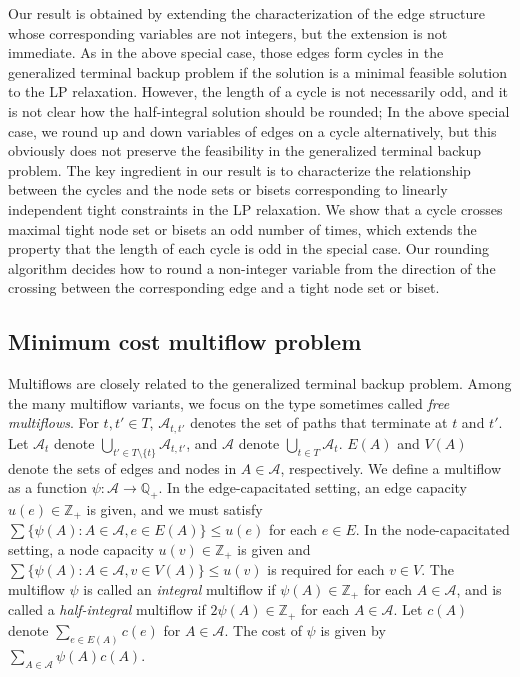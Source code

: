 \documentclass{article}
\newcommand{\Afam}{\mathcal{A}}
\newcommand{\Zset}{\mathbb{Z}}
\newcommand{\Rset}{\mathbb{Q}}
\begin{document}
Our result is obtained by extending 
the characterization of the edge structure whose corresponding variables are
not integers, but the extension is not immediate.
As in the above special case, those edges form cycles
in the generalized terminal backup problem if the solution is a minimal feasible solution to the LP relaxation.
However, the length of a cycle is not necessarily odd, and it is not clear how the half-integral solution should
be rounded; In the above special case, we round up and down variables of edges on a cycle alternatively, but this 
obviously does not preserve the feasibility in the generalized terminal backup problem.
The key ingredient in our result is to characterize the relationship between the cycles and the node sets or bisets
corresponding to linearly independent tight constraints in the LP relaxation.
We show that a cycle crosses maximal tight node set or bisets an odd number of times,
which extends the property that the length of each cycle is odd in the special case.
Our rounding algorithm decides how to round a non-integer variable 
from the direction of the crossing between the corresponding edge and a tight node set or biset.



\subsection{Minimum cost multiflow problem}\label{subsec.intro-multiflow}

Multiflows are
closely related to the generalized terminal backup problem.
Among the many multiflow variants, we focus on the type
sometimes called \emph{free multiflows}.
For $t,t' \in T$,
$\Afam_{t,t'}$ denotes the set of paths that terminate at $t$ and $t'$.
Let $\Afam_t$ denote $\bigcup_{t' \in T\setminus \{t\}}\Afam_{t,t'}$,
and $\Afam$ denote $\bigcup_{t \in T}\Afam_{t}$.
$E(A)$ and $V(A)$ denote the sets of edges and nodes in $A \in \Afam$, respectively.
We define a multiflow as a function $\psi \colon \Afam \rightarrow \Rset_+$.
In the edge-capacitated setting,
an edge capacity $u(e) \in \Zset_+$ is given,
and we must satisfy 
$\sum\{\psi(A)\colon A \in \Afam, e \in E(A)\} \leq u(e)$ for each $e \in E$.
In the node-capacitated setting, a node capacity $u(v) \in \Zset_+$ is given
and $\sum\{\psi(A)\colon A \in \Afam, v \in V(A)\} \leq u(v)$ is required for each 
$v \in V$.
The multiflow $\psi$ is called an \emph{integral} multiflow
if $\psi(A) \in \Zset_+$ for each $A \in \Afam$,
and is called a \emph{half-integral} multiflow
if $2\psi(A) \in  \Zset_+$ for each $A \in \Afam$.
Let $c(A)$ denote $\sum_{e \in E(A)}c(e)$ for $A \in \Afam$.
The cost of $\psi$ is given by
$\sum_{A \in \Afam}\psi(A)c(A)$.
\end{document}

